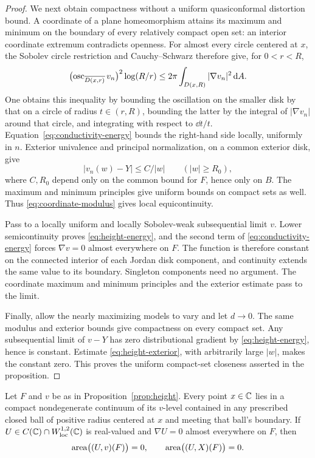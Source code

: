 \begin{proof}
We next obtain compactness without a uniform quasiconformal distortion
bound. A coordinate of a plane homeomorphism attains its maximum and
minimum on the boundary of every relatively compact open set: an
interior coordinate extremum contradicts openness. For almost every
circle centered at $x$, the Sobolev circle restriction and
Cauchy--Schwarz therefore give, for $0<r<R$,
\begin{equation}\label{eq:coordinate-modulus}
 \bigl(\operatorname{osc}_{\overline{D(x,r)}}v_n\bigr)^2\log(R/r)
 \le 2\pi\int_{D(x,R)}|\nabla v_n|^2\,\mathrm d A.
\end{equation}
One obtains this inequality by bounding the oscillation on the smaller
disk by that on a circle of radius $t\in(r,R)$, bounding the latter
by the integral of $|\nabla v_n|$ around that circle, and integrating
with respect to $\dd t/t$.
Equation~\eqref{eq:conductivity-energy} bounds the right-hand side
locally, uniformly in $n$. Exterior univalence and principal
normalization, on a common exterior disk, give
\begin{equation}\label{eq:height-exterior}
 |v_n(w)-Y|\le C/|w|\qquad(|w|\ge R_0),
\end{equation}
where $C,R_0$ depend only on the common bound for $F$, hence only on
$B$. The maximum and minimum principles give uniform bounds on compact
sets as well. Thus \eqref{eq:coordinate-modulus} gives local
equicontinuity.

Pass to a locally uniform and locally Sobolev-weak subsequential limit
$v$. Lower semicontinuity proves \eqref{eq:height-energy}, and the
second term of \eqref{eq:conductivity-energy} forces $\nabla v=0$
almost everywhere on $F$. The function is therefore constant on the
connected interior of each Jordan disk component, and continuity
extends the same value to its boundary. Singleton components need no
argument. The coordinate maximum and minimum principles and the
exterior estimate pass to the limit.

Finally, allow the nearly maximizing models to vary and let $d\to0$.
The same modulus and exterior bounds give compactness on every compact
set. Any subsequential limit of $v-Y$ has zero distributional gradient
by \eqref{eq:height-energy}, hence is constant. Estimate
\eqref{eq:height-exterior}, with arbitrarily large $|w|$, makes the
constant zero. This proves the uniform compact-set closeness asserted
in the proposition.
\end{proof}

\begin{lemma}\label{lem:level-pairs}
Let $F$ and $v$ be as in Proposition~\ref{prop:height}. Every point
$x\in\mathbb C$ lies in a compact nondegenerate continuum of its $v$-level
contained in any prescribed closed ball of positive radius centered at
$x$ and meeting that ball's boundary. If $U\in C(\mathbb C)\cap W^{1,2}_{\mathrm{loc}}(\mathbb C)$ is real-valued and
$\nabla U=0$ almost everywhere on $F$, then
\begin{equation}\label{eq:level-null-pairs}
 \operatorname{area}\bigl((U,v)(F)\bigr)=0,
 \qquad
 \operatorname{area}\bigl((U,X)(F)\bigr)=0.
\end{equation}
\end{lemma}

